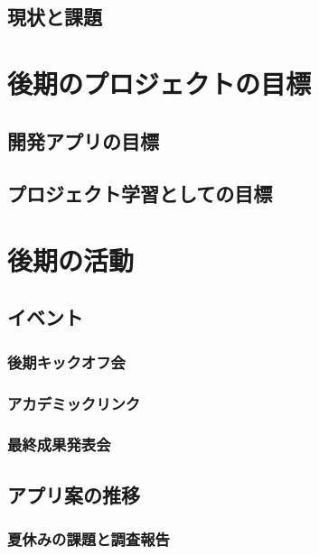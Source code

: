 \documentclass[openany,11pt,papersize]{jsbook}
\begin{document}
\section{現状と課題}



\chapter{後期のプロジェクトの目標}

\section{開発アプリの目標}

\section{プロジェクト学習としての目標}



\chapter{後期の活動}


\section{イベント}

\subsection{後期キックオフ会}

\subsection{アカデミックリンク}

\subsection{最終成果発表会}


\section{アプリ案の推移}

\subsection{夏休みの課題と調査報告}
\end{document}
